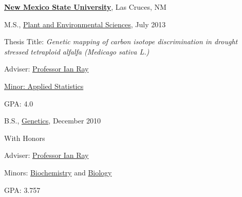 \documentclass[10pt]{article}
\renewcommand{\section}[1]{\pagebreak[3]%
    \vspace{1.3\baselineskip}%
    \phantomsection\addcontentsline{toc}{section}{#1}%
    \noindent\llap{\scshape\smash{\parbox[t]{\marginparwidth}{\hyphenpenalty=10000\raggedright #1}}}%
    \vspace{-\baselineskip}\par}
\newcommand{\blankline}{\quad\pagebreak[3]}
\begin{document}
\blankline

\href{https://www.nmsu.edu/}{\textbf{New Mexico State University}},
Las Cruces, NM
\begin{outerlist}

\item[] M.S.,
        \href{https://www.nmsu.edu/}
             {Plant and Environmental Sciences}, July 2013
        \begin{innerlist}
        \item Thesis Title: \emph{Genetic mapping of carbon isotope discrimination in drought stressed tetraploid alfalfa (\emph{Medicago sativa} L.)}
        \item Adviser:
              \href{http://aces.nmsu.edu/academics/pes/ian-ray.html}
                   {Professor Ian Ray}
        \item \href{http://nmsu.smartcatalogiq.com/en/2014-2015/Graduate-Catalog/College-of-Business/Applied-Statistics/DEGREE-Master-of-Science/MINOR-Applied-Statistics}
        			{Minor: Applied Statistics}
        \item GPA: 4.0
        \end{innerlist}

\item[] B.S.,
        \href{http://aces.nmsu.edu/academics/pes/genetics-degree.html}
             {Genetics}, December 2010
        \begin{innerlist}
        \item With Honors
        \item Adviser:
              \href{http://aces.nmsu.edu/academics/pes/ian-ray.html}
                   {Professor Ian Ray}
        \item Minors: \href{http://nmsu.smartcatalogiq.com/en/2014-2015/Undergraduate-Catalog/College-of-Arts-and-Sciences/Chemistry-and-Biochemistry/MINORS/MINOR-Biochemistry}{Biochemistry} and \href{http://nmsu.smartcatalogiq.com/en/2014-2015/Undergraduate-Catalog/College-of-Arts-and-Sciences/Biology/MINORS/MINOR-Biology}{Biology}
        \item GPA: 3.757
        \end{innerlist}

\end{outerlist}



%
\end{document}
